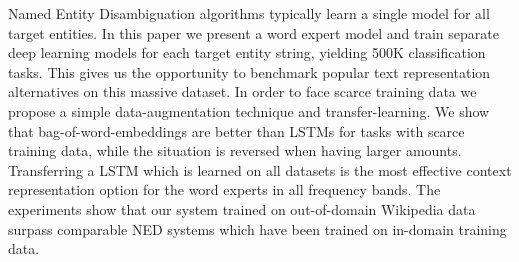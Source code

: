 Named Entity Disambiguation algorithms typically learn a single model for all target entities.  In this paper we present a word expert model and train separate deep learning models for each target entity string, yielding 500K classification tasks. This gives us the  opportunity to benchmark popular text representation alternatives on this massive dataset. In order to face scarce training data we propose a simple data-augmentation technique and transfer-learning.  We show that bag-of-word-embeddings are better than LSTMs for tasks with scarce training data, while the situation is reversed when having larger amounts. Transferring a LSTM which is learned on all datasets is the most effective context representation option for the word experts in all frequency bands. The experiments show that our system trained  on out-of-domain Wikipedia data surpass comparable NED systems which have been trained on in-domain training data.
